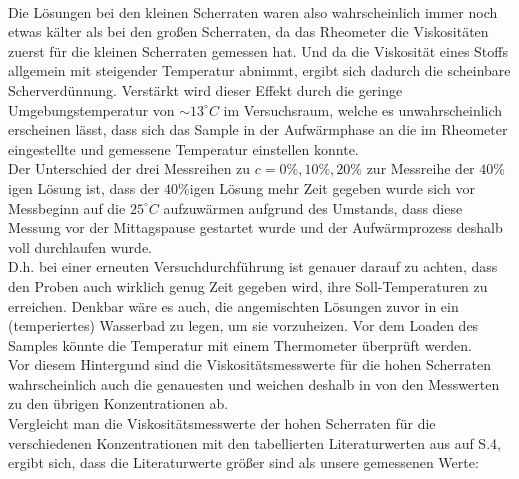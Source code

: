 \documentclass[11pt,a4paper,oneside]{scrartcl}
\begin{document}
\\ Die Lösungen bei den kleinen Scherraten waren also wahrscheinlich immer noch etwas kälter als
bei den großen Scherraten, da das Rheometer die Viskositäten zuerst für die kleinen Scherraten gemessen hat.  Und da die Viskosität eines Stoffs allgemein mit steigender Temperatur abnimmt, ergibt sich dadurch die scheinbare Scherverdünnung. Verstärkt wird dieser Effekt durch die geringe Umgebungstemperatur von $\sim 13^\circ C$ im Versuchsraum, welche es unwahrscheinlich erscheinen lässt, dass sich das Sample in der Aufwärmphase an die im Rheometer eingestellte und gemessene Temperatur einstellen konnte.\\
Der Unterschied der drei Messreihen zu $c=0\%,10\%,20\%$ zur Messreihe
der $40\%$igen Lösung ist, dass der $40\%$igen Lösung mehr Zeit gegeben wurde sich vor Messbeginn auf die $25^{\circ}C$ aufzuwärmen aufgrund des Umstands, dass diese Messung vor der Mittagspause gestartet wurde und der Aufwärmprozess deshalb voll durchlaufen wurde. \\
D.h. bei einer erneuten Versuchdurchführung
ist genauer darauf zu achten, dass den Proben auch wirklich genug Zeit gegeben wird, ihre Soll-Temperaturen zu erreichen. Denkbar wäre es auch, die angemischten Lösungen zuvor in ein (temperiertes) Wasserbad zu legen, um sie vorzuheizen. Vor dem Loaden des Samples könnte die Temperatur mit einem Thermometer überprüft werden.\\
Vor diesem Hintergund sind die Viskositätsmesswerte für die hohen Scherraten wahrscheinlich auch die genauesten und weichen deshalb in  von den Messwerten zu den übrigen Konzentrationen ab. \\

Vergleicht man die Viskositätsmesswerte der hohen Scherraten für die verschiedenen
Konzentrationen mit den tabellierten Literaturwerten aus \cite{visaq} auf S.4, ergibt sich, dass die Literaturwerte größer sind als unsere gemessenen Werte:
\end{document}
